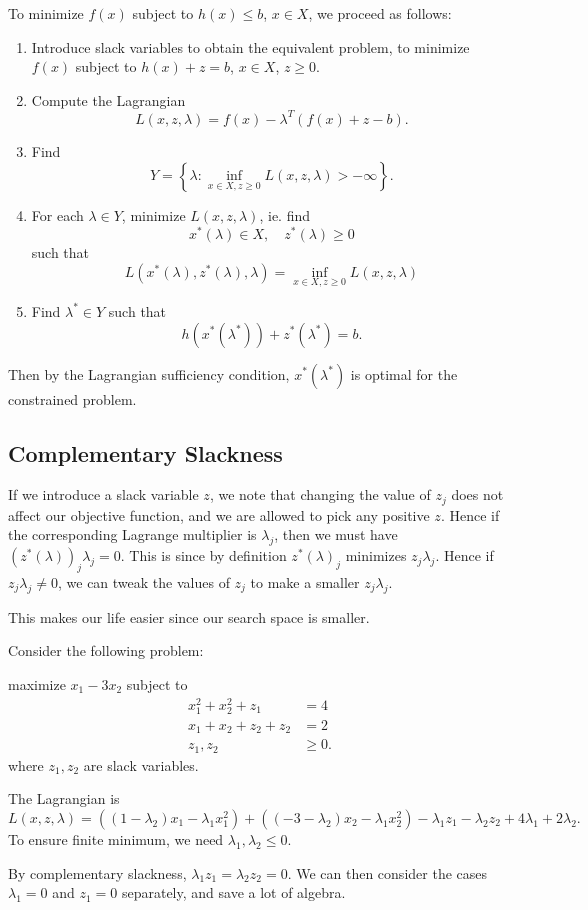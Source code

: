 \documentclass[a4paper]{article}
\begin{document}
To minimize $f(x)$ subject to $h(x) \leq b$, $x\in X$, we proceed as follows:
\begin{enumerate}
  \item Introduce slack variables to obtain the equivalent problem, to minimize $f(x)$ subject to $h(x) + z = b$, $x \in X$, $z \geq 0$.
  \item Compute the Lagrangian
    \[
      L(x, z, \lambda) = f(x) - \lambda^T(f(x) + z - b).
    \]
  \item Find
    \[
      Y = \left\{\lambda: \inf_{x\in X, z\geq 0}L(x, z, \lambda) > -\infty\right\}.
    \]
  \item For each $\lambda\in Y$, minimize $L(x, z, \lambda)$, ie. find
    \[
      x^*(\lambda)\in X,\quad z^*(\lambda) \geq 0
    \]
    such that
    \[
      L(x^*(\lambda), z^*(\lambda), \lambda) = \inf_{x\in X, z\geq 0} L(x, z, \lambda)
    \]
  \item Find $\lambda^*\in Y$ such that
    \[
      h(x^*(\lambda^*)) + z^*(\lambda^*) = b.
    \]
\end{enumerate}
Then by the Lagrangian sufficiency condition, $x^*(\lambda^*)$ is optimal for the constrained problem.

\subsection{Complementary Slackness}
If we introduce a slack variable $z$, we note that changing the value of $z_j$ does not affect our objective function, and we are allowed to pick any positive $z$. Hence if the corresponding Lagrange multiplier is $\lambda_j$, then we must have $(z^*(\lambda))_j \lambda_j = 0$. This is since by definition $z^*(\lambda)_j$ minimizes $z_j \lambda_j$. Hence if $z_j \lambda_j \not= 0$, we can tweak the values of $z_j$ to make a smaller $z_j \lambda_j$.

This makes our life easier since our search space is smaller.

\begin{eg}
  Consider the following problem:
  \begin{center}
    maximize $x_1 - 3x_2$ subject to
    \begin{align*}
      x_1^2 + x_2^2 + z_1 &= 4\\
      x_1 + x_2 + z_2 + z_2 &= 2\\
      z_1, z_2 &\geq 0.
    \end{align*}
  where $z_1, z_2$ are slack variables.
  \end{center}

  The Lagrangian is
  \[
    L(x, z, \lambda) = ((1 - \lambda_2)x_1 - \lambda_1 x_1^2) + ((-3 - \lambda_2)x_2 - \lambda_1 x_2^2) - \lambda_1 z_1 - \lambda_2 z_2 + 4\lambda_1 + 2\lambda_2.
  \]
  To ensure finite minimum, we need $\lambda_1, \lambda_2 \leq 0$.

  By complementary slackness, $\lambda_1 z_1 = \lambda_2 z_2 = 0$. We can then consider the cases $\lambda_1 = 0$ and $z_1 = 0$ separately, and save a lot of algebra.
\end{eg}
\end{document}

